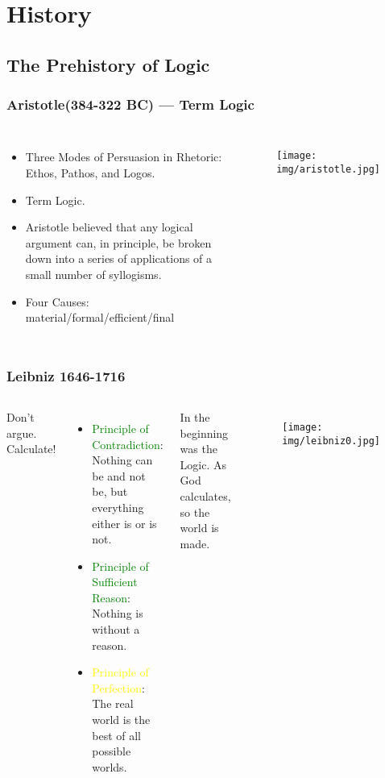 \documentclass[UTF8,aspectratio=43,11pt,colorlinks,compress,openany]{beamer}%
\begin{document}
\section{History}


\subsection{The Prehistory of Logic}

\begin{frame}\frametitle{Aristotle(384-322 BC) --- Term Logic}
	\begin{columns}
			\begin{itemize}
				\item Three Modes of Persuasion in Rhetoric: Ethos, Pathos, and Logos.
				\item Term Logic.
				\item Aristotle believed that any logical argument can, in principle, be broken down into a series of applications of a small number of syllogisms.
				\item Four Causes: material/formal/efficient/final
			\end{itemize}
			\begin{figure}
				\texttt{[image: img/aristotle.jpg]}
			\end{figure}
	\end{columns}
\end{frame}

\begin{frame}\frametitle{Leibniz 1646-1716}
	\begin{columns}
		\column{0.57\textwidth}
			\begin{block}{}
				\centerline{\Large Don't argue. Calculate!}
			\end{block}
			\begin{itemize}
				\item \textcolor{green}{{\small Principle of Contradiction}}: Nothing can be and not be, but everything either is or is not.
				\item \textcolor{green}{{\small Principle of Sufficient Reason}}: Nothing is without a reason.
				\item \textcolor{yellow}{{\small Principle of Perfection}}: The real world is the best of all possible worlds.
			\end{itemize}
			\begin{block}{In the beginning was the Logic.}
				As God calculates, so the world is made.
			\end{block}
		\column{0.23\textwidth}
			\begin{figure}
				\texttt{[image: img/leibniz0.jpg]}
			\end{figure}
	\end{columns}
\end{frame}
\end{document}
